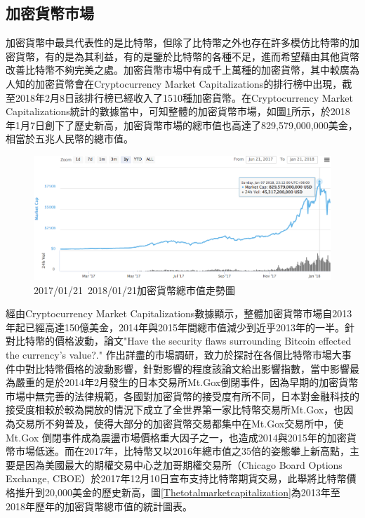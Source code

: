 		\subsection{加密貨幣市場}

		加密貨幣中最具代表性的是比特幣，但除了比特幣之外也存在許多模仿比特幣的加密貨幣，有的是為其利益，有的是鑒於比特幣的各種不足，進而希望藉由其他貨幣改善⽐特幣不夠完美之處。加密貨幣市場中有成千上萬種的加密貨幣，其中較廣為人知的加密貨幣會在Cryptocurrency Market Capitalizations\supercite{CryptocurrencyMarketCapitalizations}的排行榜中出現，截至2018年2月8日該排行榜已經收入了1510種加密貨幣。在Cryptocurrency Market Capitalizations統計的數據當中，可知整體的加密貨幣市場，如圖\ref{TotalMarketCapitalization}所示，於2018年1月7日創下了歷史新高，加密貨幣市場的總市值也高達了829,579,000,000美金，相當於五兆人民幣的總市值。

		\begin{figure}[!htbp]
			\centering
			\includegraphics[width = .9\textwidth]{TotalMarketCapitalization.png}
			\caption{2017/01/21~2018/01/21加密貨幣總市值走勢圖\supercite{CryptocurrencyMarketCapitalizations}}\label{TotalMarketCapitalization}
		\end{figure}

		經由Cryptocurrency Market Capitalizations數據顯示，整體加密貨幣市場自2013年起已經高達150億美金，2014年與2015年間總市值減少到近乎2013年的一半。針對比特幣的價格波動，論文"Have the security flaws surrounding Bitcoin effected the currency's value?."
		\supercite{HavethesecurityflawssurroundingBITCOINeffectedthecurrencysvalue?}
		作出詳盡的市場調研，致力於探討在各個比特幣市場大事件中對比特幣價格的波動影響，針對影響的程度該論文給出影響指數，當中影響最為嚴重的是於2014年2月發生的日本交易所Mt.Gox倒閉事件，因為早期的加密貨幣市場中無完善的法律規範，各國對加密貨幣的接受度有所不同，日本對金融科技的接受度相較於較為開放的情況下成立了全世界第一家比特幣交易所Mt.Gox，也因為交易所不夠普及，使得大部分的加密貨幣交易都集中在Mt.Gox交易所中，使Mt.Gox 倒閉事件成為震盪市場價格重⼤因⼦之⼀，也造成2014與2015年的加密貨幣市場低迷。而在2017年，比特幣又以2016年總市值之35倍的姿態攀上新高點，主要是因為美國最大的期權交易中心芝加哥期權交易所（Chicago Board Options Exchange, CBOE）於2017年12月10日宣布支持比特幣期貨交易，此舉將比特幣價格推升到20,000美金的歷史新高，圖\ref{Thetotalmarketcapitalization}為2013年至2018年歷年的加密貨幣總市值的統計圖表。


